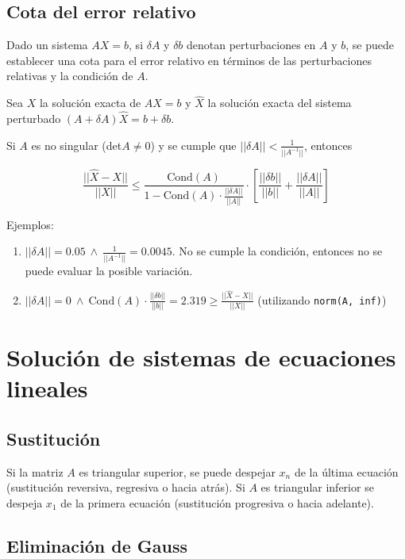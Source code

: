 \documentclass{article}
\begin{document}
\subsection{Cota del error relativo}

Dado un sistema $AX=b$, si $\delta A$ y $\delta b$ denotan perturbaciones en $A$
y $b$, se puede establecer una cota para el error relativo en términos de las 
perturbaciones relativas y la condición de $A$.

Sea $X$ la solución exacta de $AX=b$ y $\hat{X}$ la solución exacta del sistema 
perturbado $(A+\delta A)\hat{X} = b + \delta b$.

Si $A$ es no singular (det$A\neq0$) y se cumple que 
$||\delta A|| < \frac{1}{||A^{-1}||}$, entonces

\begin{equation}
    \frac{||\hat{X}-X||}{||X||} \leq 
    \frac{\text{Cond}(A)}{1-\text{Cond}(A)\cdot\frac{||\delta A||}{||A||}}\cdot\left[ \frac{||\delta b||}{||b||} + \frac{||\delta A||}{||A||} \right]
\end{equation}

Ejemplos:
\begin{enumerate}
    \item $||\delta A|| = 0.05\ \land\ \frac{1}{||A^{-1}||}=0.0045$. No se 
        cumple la condición, entonces no se puede evaluar la posible variación.
    \item $||\delta A|| = 0\ \land\ \text{Cond}(A)\cdot\frac{||\delta b||}{||b||} = 2.319 \geq \frac{||\hat{X}-X||}{||X||}$ (utilizando \verb|norm(A, inf)|)
\end{enumerate}


\section{Solución de sistemas de ecuaciones lineales}

\subsection{Sustitución}

Si la matriz $A$ es triangular superior, se puede despejar $x_n$ de la última
ecuación (sustitución reversiva, regresiva o hacia atrás). Si $A$ es triangular 
inferior se despeja $x_1$ de la primera ecuación (sustitución progresiva o 
hacia adelante).

\subsection{Eliminación de Gauss}
\end{document}
